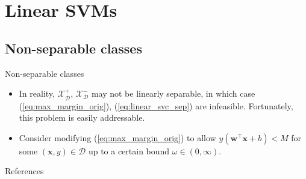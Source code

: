 \documentclass{beamer}
\numberwithin{equation}{section}
\newcommand{\aref}[1]{\alert{\ref{#1}}}
\begin{document}
\section{Linear SVMs}

\subsection{Non-separable classes}

\begin{frame}{Non-separable classes}
    \begin{itemize}
        \item
        In reality, $ \mathcal{X}_\mathcal{D}^+ $,
        $ \mathcal{X}_\mathcal{D}^- $ may not be linearly separable, in which
        case (\aref{eq:max_margin_orig}), (\aref{eq:linear_svc_sep}) are
        infeasible. Fortunately, this problem is easily addressable.

        \item
        Consider modifying (\aref{eq:max_margin_orig}) to allow
        $ y(\mathbf{w}^\top\mathbf{x} + b) < M $ for some $ (\mathbf{x}, y)
        \in \mathcal{D} $ up to a certain bound $ \omega \in (0, \infty) $.

    \end{itemize}
\end{frame}

%
%

\begin{frame}{References}
    
    
\end{frame}
\end{document}
